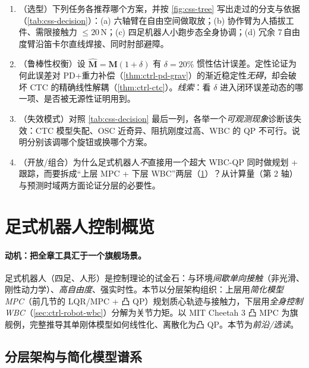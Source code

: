 \begin{practice}
\begin{enumerate}
  \item （选型）下列任务各推荐哪个方案，并按 \cref{fig:css-tree} 写出走过的分支与依据（\cref{tab:css-decision}）：(a) 六轴臂在自由空间做取放；(b) 协作臂为人插拔工件、需限接触力 $\le20$\,N；(c) 四足机器人小跑步态全身协调；(d) 冗余 7\,自由度臂沿笛卡尔直线焊接、同时肘部避障。
  \item （鲁棒性权衡）设 $\hat{\mathbf{M}}=\mathbf{M}(1+\delta)$ 有 $\delta=20\%$ 惯性估计误差。定性论证为何此误差对 PD+重力补偿（\cref{thm:ctrl-pd-grav}）的渐近稳定性\emph{无碍}，却会破坏 CTC 的精确线性解耦（\cref{thm:ctrl-ctc}）。\emph{线索}：看 $\delta$ 进入闭环误差动态的哪一项、是否被无源性证明用到。
  \item （失效模式）对照 \cref{tab:css-decision} 最后一列，各举一个\emph{可观测现象}诊断该失效：CTC 模型失配、OSC 近奇异、阻抗刚度过高、WBC 的 QP 不可行。说明分别该调哪个旋钮或换哪个方案。
  \item （开放/组合）为什么足式机器人\emph{不}直接用一个超大 WBC-QP 同时做规划 + 跟踪，而要拆成“上层 MPC + 下层 WBC”两层（\cref{sec:ctrl-legged}）？从计算量（第 2 轴）与预测时域两方面论证分层的必要性。
\end{enumerate}
\end{practice}

\section{足式机器人控制概览}
\label{sec:ctrl-legged}

\paragraph{动机：把全章工具汇于一个旗舰场景。}
足式机器人（四足、人形）是控制理论的试金石：与环境\emph{间歇单向接触}（非光滑、刚性动力学）、\emph{高自由度}、强实时性。本节以分层架构组织：上层用\emph{简化模型 MPC}（前几节的 LQR/MPC + 凸 QP）规划质心轨迹与接触力，下层用\emph{全身控制 WBC}（\cref{sec:ctrl-robot-wbc}）分解为关节力矩。以 MIT Cheetah 3 凸 MPC 为旗舰例，完整推导其单刚体模型如何线性化、离散化为凸 QP。本节为\emph{前沿/选读}。

\subsection{分层架构与简化模型谱系}
\label{sec:ctrl-legged-arch}

